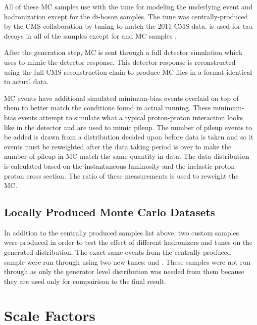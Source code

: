 All of these MC samples use \PYTHIAsix with the \ZTwoStar tune for modeling the
underlying event and hadronization except for the di-boson samples. The
\ZTwoStar tune was centrally-produced by the CMS collaboration by tuning
\PYTHIAsix to match the 2011 CMS data. \Tauola is used for tau decays in all of
the samples except for \ttbar and \POWHEG \DYtoee MC samples \cite{was_2007}.



After the generation step, MC is sent through a full detector simulation which
uses \GEANTfour \cite{agostinelli2003} to mimic the detector response. This
detector response is reconstructed using the full CMS reconstruction chain to
produce MC files in a format identical to actual data.

MC events have additional simulated minimum-bias events overlaid on top of them
to better match the conditions found in actual running. These minimum-bias
events attempt to simulate what a typical proton-proton interaction looks like
in the detector and are used to mimic pileup. The number of pileup events to be
added is drawn from a distribution decided upon before data is taken and so it
events must be reweighted after the data taking period is over to make the
number of pileup in MC match the same quantity in data. The data distribution
is calculated based on the instantaneous luminosity and the inelastic
proton-proton cross section. The ratio of these measurements is used to
reweight the MC.

\subsection{Locally Produced Monte Carlo Datasets}
\label{ssec:custom_samples}

In addition to the centrally produced samples list above, two custom samples
were produced in order to test the effect of different hadronizers and tunes on
the generated \phistar distribution. The exact same events from the centrally
produced \POWHEG \DYtoee sample were run through \PYTHIAeight using two new
tunes: \TunePPfive and \TunePPfourteen. These samples were not run through
\GEANTfour as only the generator level \phistar distribution was needed from
them because they are used only for compairison to the final result.

\section{Scale Factors}
\label{sec:scale_factors}

